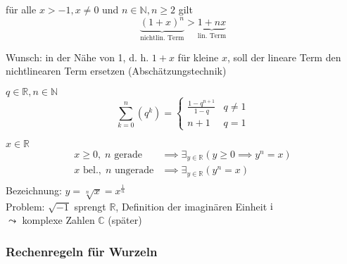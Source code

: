 \begin{proposition}
  für alle $x > -1, x \neq 0$ und $n \in \mathbb{N}, n \geq 2$ gilt
  \begin{equation*} \underbrace{(1+x)^n}_\text{nichtlin. Term} > \underbrace{1+nx}_\text{lin. Term} \end{equation*}
  \induction
\end{proposition}
%
Wunsch: in der Nähe von 1, d. h. $1+x$ für kleine $x$, soll der lineare Term den nichtlinearen Term ersetzen (Abschätzungstechnik)

\begin{theorem}\flush
  $q \in \mathbb{R}, n \in \mathbb{N}$
  \begin{equation*} \sum_{k=0}^n \left( q^k\right) = \begin{cases}\frac{1-q^{n+1}}{1-q} & q \neq 1 \\ n+1 & q = 1\end{cases} \end{equation*}
  \induction
\end{theorem}

\begin{definition}[$n$-te Wurzel]
 $x\in \mathbb{R}$
 \begin{align*}
  x \geq 0,\; n \text{ gerade} &\implies \exists_{y \in \mathbb{R}} \left( y \geq 0 \implies y^n = x \right) \\
  x \text{ bel.},\; n \text{ ungerade} &\implies \exists_{y \in \mathbb{R}} \left( y^n = x \right) \\
 \end{align*}
Bezeichnung: $y = \sqrt[n]{x} = x^\frac 1 n$\\
Problem: $\sqrt{-1}$ sprengt $\mathbb{R}$, Definition der imaginären Einheit $\operatorname{i}$\\$\leadsto$ komplexe Zahlen $\mathbb{C}$ (später)
\end{definition}

\subsubsection*{Rechenregeln für Wurzeln}

